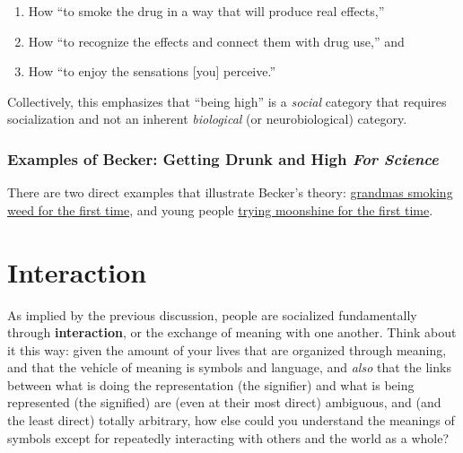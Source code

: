 \documentclass[
  letterpaper,
  DIV=11,
  numbers=noendperiod,
  oneside]{scrartcl}
\providecommand{\tightlist}{%
  \setlength{\itemsep}{0pt}\setlength{\parskip}{0pt}}
\begin{document}
\begin{enumerate}
\def\labelenumi{\arabic{enumi}.}
\tightlist
\item
  How ``to smoke the drug in a way that will produce real effects,''
\item
  How ``to recognize the effects and connect them with drug use,'' and
\item
  How ``to enjoy the sensations {[}you{]} perceive.''
\end{enumerate}

Collectively, this emphasizes that ``being high'' is a \emph{social}
category that requires socialization and not an inherent
\emph{biological} (or neurobiological) category.

\subsubsection{\texorpdfstring{Examples of Becker: Getting Drunk and
High \emph{For
Science}}{Examples of Becker: Getting Drunk and High For Science}}\label{examples-of-becker-getting-drunk-and-high-for-science}

There are two direct examples that illustrate Becker's theory:
\href{https://www.youtube.com/watch?v=IRBAZJ4lF0U}{grandmas smoking weed
for the first time}, and young people
\href{https://www.youtube.com/watch?v=L5J62dfPq88}{trying moonshine for
the first time}.

\section{Interaction}\label{interaction}

As implied by the previous discussion, people are socialized
fundamentally through \textbf{interaction}, or the exchange of meaning
with one another. Think about it this way: given the amount of your
lives that are organized through meaning, and that the vehicle of
meaning is symbols and language, and \emph{also} that the links between
what is doing the representation (the signifier) and what is being
represented (the signified) are (even at their most direct) ambiguous,
and (and the least direct) totally arbitrary, how else could you
understand the meanings of symbols except for repeatedly interacting
with others and the world as a whole?

\end{document}
